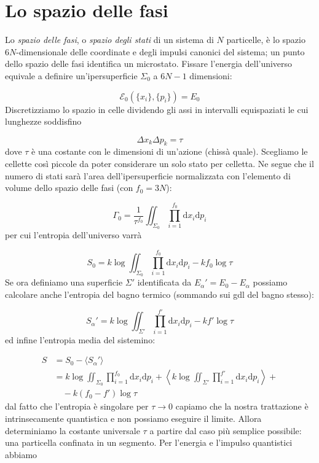 \documentclass[a4paper]{report}
\begin{document}
\section{Lo spazio delle fasi}

Lo \textit{spazio delle fasi}, o \textit{spazio degli stati} di un sistema di $N$ particelle, è lo spazio $6N$-dimensionale delle coordinate e degli impulsi canonici del sistema; un punto dello spazio delle fasi identifica un microstato. Fissare l'energia dell'universo equivale a definire un'ipersuperficie $\Sigma_0$ a $6N-1$ dimensioni:

\begin{equation}
    \mathcal{E}_0\left(\{x_i\},\{p_i\}\right) = E_0
\end{equation}
Discretizziamo lo spazio in celle dividendo gli assi in intervalli equispaziati le cui lunghezze soddisfino

\begin{equation}
    \Delta x_k \Delta p_k = \tau
\end{equation}
dove $\tau$ è una costante con le dimensioni di un'azione (chissà quale). Scegliamo le cellette così piccole da poter considerare un solo stato per celletta. Ne segue che il numero di stati sarà l'area dell'ipersuperficie normalizzata con l'elemento di volume dello spazio delle fasi (con $f_0 = 3N$):

\begin{equation}
    \Gamma_0 = \frac{1}{\tau^{f_0}} \iint_{\Sigma_0} \prod_{i=1}^{ f_0} \mathrm{d}x_i \mathrm{d}p_i
\end{equation}
per cui l'entropia dell'universo varrà

\begin{equation}
    S_0 = k \log \iint_{\Sigma_0} \prod_{i=1}^{f_0} \mathrm{d}x_i \mathrm{d}p_i - k f_0 \log \tau
\end{equation}
Se ora definiamo una superficie $\Sigma'$ identificata da $E_\alpha' = E_0 - E_\alpha$ possiamo calcolare anche l'entropia del bagno termico (sommando sui gdl del bagno stesso):

\begin{equation}
    S_\alpha' = k \log \iint_{\Sigma'} \prod_{i=1}^{f'} \mathrm{d}x_i \mathrm{d}p_i - k f' \log \tau
\end{equation}
ed infine l'entropia media del sistemino:

\begin{equation}
\begin{split}
    S & = S_0 - \langle S_\alpha'\rangle \\
    & = k \log \iint_{\Sigma_0} \prod_{i=1}^{ f_0} \mathrm{d}x_i \mathrm{d}p_i 
      + \left\langle k \log \iint_{\Sigma'} \prod_{i=1}^{ f'} \mathrm{d}x_i \mathrm{d}p_i  \right\rangle + \\
    & \quad - k (f_0 - f') \log \tau
\end{split}
\end{equation}
dal fatto che l'entropia è singolare per $\tau\rightarrow 0$ capiamo che la nostra trattazione è intrinsecamente quantistica e non possiamo eseguire il limite. Allora determiniamo la costante universale $\tau$ a partire dal caso più semplice possibile: una particella confinata in un segmento. Per l'energia e l'impulso quantistici abbiamo
\end{document}

